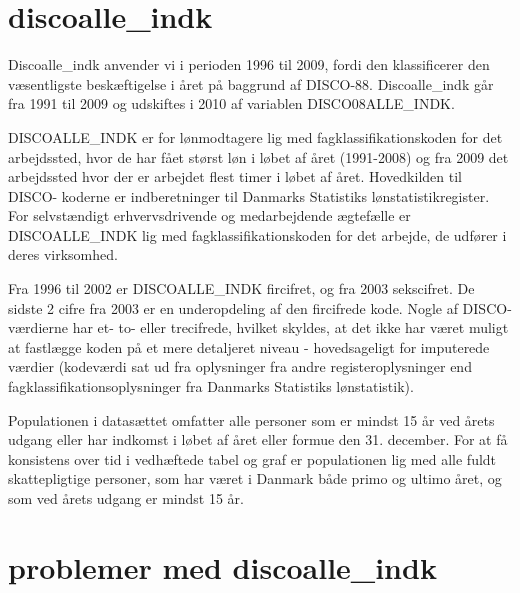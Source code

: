 \section{discoalle\_indk \label{}}

Discoalle\_indk anvender vi i perioden 1996 til 2009, fordi den klassificerer den væsentligste beskæftigelse i året på baggrund af DISCO-88. Discoalle\_indk går fra 1991 til 2009 og udskiftes i 2010 af variablen DISCO08ALLE\_INDK.

DISCOALLE\_INDK er for lønmodtagere lig med fagklassifikationskoden for det
arbejdssted, hvor de har fået størst løn i løbet af året (1991-2008) og fra 2009 det
arbejdssted hvor der er arbejdet flest timer i løbet af året. Hovedkilden til DISCO-
koderne er indberetninger til Danmarks Statistiks lønstatistikregister. For selvstændigt erhvervsdrivende og medarbejdende ægtefælle er DISCOALLE\_INDK lig med fagklassifikationskoden for det arbejde, de udfører i deres virksomhed.

Fra 1996 til 2002 er DISCOALLE\_INDK fircifret, og fra 2003 sekscifret. De sidste 2 cifre
fra 2003 er en underopdeling af den fircifrede kode. Nogle af DISCO-værdierne har et- to- eller trecifrede, hvilket skyldes, at det ikke har været muligt at fastlægge koden på et mere detaljeret niveau - hovedsageligt for imputerede værdier (kodeværdi sat ud fra oplysninger fra andre registeroplysninger end fagklassifikationsoplysninger fra Danmarks Statistiks lønstatistik). 

Populationen i datasættet omfatter alle personer som er mindst 15 år ved årets udgang eller har indkomst i løbet af året eller formue den 31. december. For at få konsistens over tid i vedhæftede tabel og graf er populationen lig med alle fuldt skattepligtige personer, som har været i Danmark både primo og ultimo året, og som ved årets udgang er mindst 15 år.


\section{problemer med discoalle\_indk \label{}}

